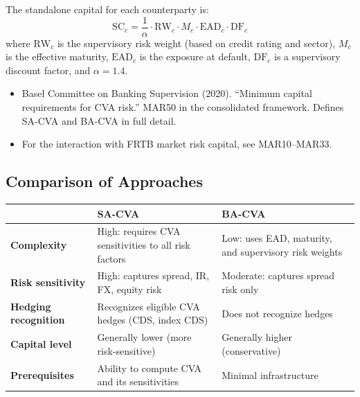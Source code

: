 \documentclass[11pt, a4paper]{article}
\theoremstyle{definition}
\theoremstyle{plain}
\theoremstyle{remark}
\begin{document}
The standalone capital for each counterparty is:
\[
    \text{SC}_c = \frac{1}{\alpha}\cdot \text{RW}_c \cdot M_c \cdot \text{EAD}_c \cdot \text{DF}_c
\]
where $\text{RW}_c$ is the supervisory risk weight (based on credit rating and sector),
$M_c$ is the effective maturity, $\text{EAD}_c$ is the exposure at default,
$\text{DF}_c$ is a supervisory discount factor, and $\alpha = 1.4$.

\begin{refbox}
\begin{itemize}
    \item Basel Committee on Banking Supervision (2020).
          ``Minimum capital requirements for CVA risk.'' MAR50 in the consolidated framework.
          Defines SA-CVA and BA-CVA in full detail.
    \item For the interaction with FRTB market risk capital, see MAR10--MAR33.
\end{itemize}
\end{refbox}

\subsection{Comparison of Approaches}

\begin{center}
\begin{tabular}{@{}p{3.5cm}p{4.8cm}p{4.8cm}@{}}
\toprule
& \textbf{SA-CVA} & \textbf{BA-CVA} \\
\midrule
\textbf{Complexity}     & High: requires CVA sensitivities to all risk factors
                        & Low: uses EAD, maturity, and supervisory risk weights \\[4pt]
\textbf{Risk sensitivity} & High: captures spread, IR, FX, equity risk
                          & Moderate: captures spread risk only \\[4pt]
\textbf{Hedging recognition} & Recognizes eligible CVA hedges (CDS, index CDS)
                              & Does not recognize hedges \\[4pt]
\textbf{Capital level}  & Generally lower (more risk-sensitive)
                        & Generally higher (conservative) \\[4pt]
\textbf{Prerequisites}  & Ability to compute CVA and its sensitivities
                        & Minimal infrastructure \\
\bottomrule
\end{tabular}
\end{center}
\end{document}
